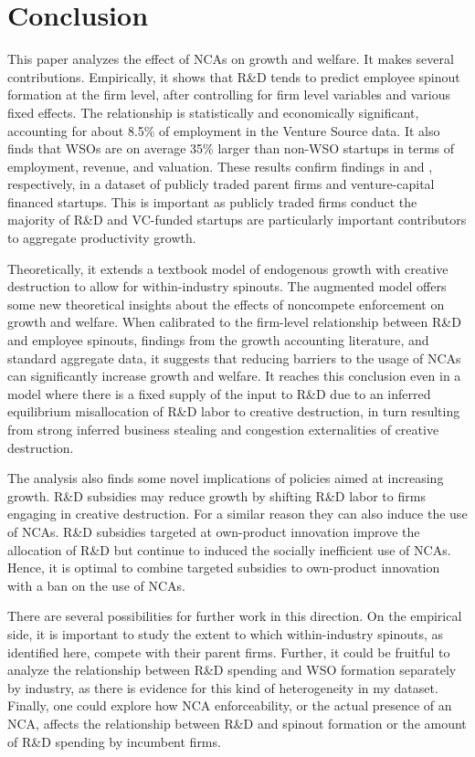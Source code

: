 \documentclass[11pt,english]{article}
\theoremstyle{definition}
\begin{document}
\section{Conclusion}\label{sec:conclusion}
 
This paper analyzes the effect of NCAs on growth and welfare. It makes several contributions. Empirically, it shows that R\&D tends to predict employee spinout formation at the firm level, after controlling for firm level variables and various fixed effects. The relationship is statistically and economically significant, accounting for about 8.5\% of employment in the Venture Source data. It also finds that WSOs are on average 35\% larger than non-WSO startups in terms of employment, revenue, and valuation. These results confirm findings in \cite{babina_entrepreneurial_2019} and \cite{muendler_employee_2012}, respectively, in a dataset of publicly traded parent firms and venture-capital financed startups. This is important as publicly traded firms conduct the majority of R\&D and VC-funded startups are particularly important contributors to aggregate productivity growth. 

Theoretically, it extends a textbook model of endogenous growth with creative destruction to allow for within-industry spinouts. The augmented model offers some new theoretical insights about the effects of noncompete enforcement on growth and welfare. When calibrated to the firm-level relationship between R\&D and employee spinouts, findings from the growth accounting literature, and standard aggregate data, it suggests that reducing barriers to the usage of NCAs can significantly increase growth and welfare. It reaches this conclusion even in a model where there is a fixed supply of the input to R\&D due to an inferred equilibrium misallocation of R\&D labor to creative destruction, in turn resulting from strong inferred business stealing and congestion externalities of creative destruction.

The analysis also finds some novel implications of policies aimed at increasing growth. R\&D subsidies may reduce growth by shifting R\&D labor to firms engaging in creative destruction. For a similar reason they can also induce the use of NCAs. R\&D subsidies targeted at own-product innovation improve the allocation of R\&D but continue to induced the socially inefficient use of NCAs. Hence, it is optimal to combine targeted subsidies to own-product innovation with a ban on the use of NCAs.

There are several possibilities for further work in this direction. On the empirical side, it is important to study the extent to which within-industry spinouts, as identified here, compete with their parent firms. Further, it could be fruitful to analyze the relationship between R\&D spending and WSO formation separately by industry, as there is evidence for this kind of heterogeneity in my dataset. Finally, one could explore how NCA enforceability, or the actual presence of an NCA, affects the relationship between R\&D and spinout formation or the amount of R\&D spending by incumbent firms.
\end{document}
